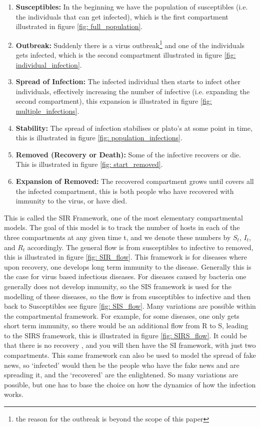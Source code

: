 \documentclass[fontsize=17pt]{article}
\begin{document}
\begin{enumerate}
	\item \textbf{Susceptibles:} In the beginning we have the population of susceptibles (i.e. the individuals that can get infected), which is the first compartment illustrated in figure \ref{fig: full_population}. 
	\item \textbf{Outbreak:} Suddenly there is a virus outbreak\footnote{the reason for the outbreak is beyond the scope of this paper} and one of the individuals gets infected, which is the second compartment illustrated in figure \ref{fig: individual_infection}. 
	\item \textbf{Spread of Infection:} The infected individual then starts to infect other individuals, effectively increasing the number of infective (i.e. expanding the second compartment), this expansion is illustrated in figure \ref{fig: multiple_infections}.
	\item \textbf{Stability:} The spread of infection stabilises or plato's at some point in time, this is illustrated in figure \ref{fig: population_infections}.
	\item \textbf{Removed (Recovery or Death): }Some of the infective recovers or die. This is illustrated in figure \ref{fig: start_removed}.
	\item \textbf{Expansion of Removed: }The recovered compartment grows until covers all the infected compartment, this is both people who have recovered with immunity to the virus, or have died.
	
\end{enumerate}

This is called the SIR Framework, one of the most elementary compartmental models. The goal of this model is to track the number of hosts in each of the three compartments at any given time t, and we denote these numbers by $S_t$, $I_t$, and $R_t$ accordingly. The general flow is from susceptibles to infective to removed, this is illustrated in figure \ref{fig: SIR_flow}. This framework is for diseases where upon recovery, one develops long term immunity to the disease. Generally this is the case for virus based infectious diseases. For diseases caused by bacteria one generally does not develop immunity, so the SIS framework is used for the modelling of these diseases, so the flow is from susceptibles to infective and then back to Susceptibles see figure \ref{fig: SIS_flow}.
Many variations are possible within the compartmental framework. For example, for some diseases, one only gets short term immunity, so there would be an additional flow from R to S, leading to the SIRS framework, this is illustrated in figure \ref{fig: SIRS_flow}. It could be that there is no recovery , and you will then have the SI framework, with just two compartments. This same framework can also be used to model the spread of fake news, so `infected' would then be the people who have the fake news and are spreading it, and the `recovered' are the enlightened. So many variations are possible, but one has to base the choice on how the dynamics of how the infection works.
\end{document}
